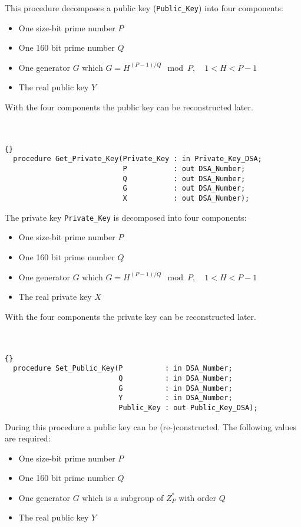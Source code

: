 This procedure decomposes a public key (\texttt{Public\_Key}) into four components:
\begin{itemize}
\item One size-bit prime number $P$
\item One 160 bit prime number $Q$
\item One generator $G$ which $G=H^{(P-1)/Q}\mod P,\quad 1<H<P-1$
\item The real public key $Y$
\end{itemize}
With the four components the public key can be reconstructed later.\\
\hline \\ \ \\
\begin{lstlisting}{}
  procedure Get_Private_Key(Private_Key : in Private_Key_DSA;
                            P           : out DSA_Number;
                            Q           : out DSA_Number;
                            G           : out DSA_Number;
                            X           : out DSA_Number);
\end{lstlisting}
The private key \texttt{Private\_Key} is decomposed into four components:
\begin{itemize}
\item One size-bit prime number $P$
\item One 160 bit prime number $Q$
\item One generator $G$ which $G=H^{(P-1)/Q}\mod P,\quad 1<H<P-1$
\item The real private key $X$
\end{itemize}
With the four components the private key can be reconstructed later.\\
\hline \\ \ \\
\begin{lstlisting}{}
  procedure Set_Public_Key(P          : in DSA_Number;
                           Q          : in DSA_Number;
                           G          : in DSA_Number;
                           Y          : in DSA_Number;
                           Public_Key : out Public_Key_DSA);
\end{lstlisting}
During this procedure a public key can be (re-)constructed. The following values are required:
\begin{itemize}
\item One size-bit prime number $P$
\item One 160 bit prime number $Q$
\item One generator $G$ which is a subgroup of $Z^*_P$ with order $Q$
\item The real public key $Y$
\end{itemize}
